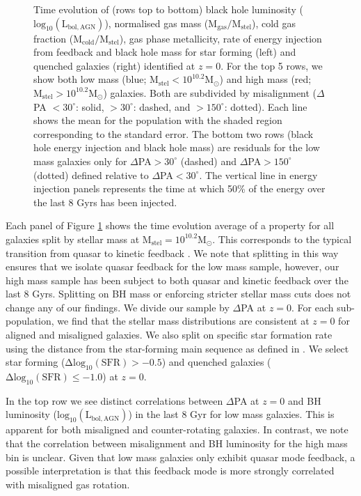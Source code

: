 \documentclass[fleqn,usenatbib]{mnras}
\begin{document}
\begin{figure}
    \caption{Time evolution of (rows top to bottom) black hole luminosity ($\mathrm{log_{10}(L_{bol, AGN})}$), normalised gas mass ($\mathrm{M_{gas}/M_{stel}}$), cold gas fraction ($\mathrm{M_{cold}/M_{stel}}$), gas phase metallicity, rate of energy injection from feedback and black hole mass for star forming (left) and quenched galaxies (right) identified at $z=0$. For the top 5 rows, we show both low mass (blue; $\mathrm{M_{stel} < 10^{10.2}M_{\odot}}$) and high mass (red; $\mathrm{M_{stel} > 10^{10.2}M_{\odot}}$) galaxies. Both are subdivided by misalignment ($\Delta$PA $< 30^{\circ}$: solid, $> 30^{\circ}$: dashed, and  $> 150^{\circ}$: dotted). Each line shows the mean for the population with the shaded region corresponding to the standard error. The bottom two rows (black hole energy injection and black hole mass) are residuals for the low mass galaxies only for $\Delta$PA$ > 30^{\circ}$ (dashed) and $\Delta$PA$ > 150^{\circ}$ (dotted) defined relative to $\Delta$PA$ < 30^{\circ}$. The vertical line in energy injection panels represents the time at which 50\% of the energy over the last 8 Gyrs has been injected.}
    \label{fig:overall_pop}
\end{figure}

Each panel of Figure \ref{fig:overall_pop} shows the time evolution average of a property for all galaxies split by stellar mass at $\mathrm{M_{stel} = 10^{10.2}M_{\odot}}$. This corresponds to the typical transition from quasar to kinetic feedback \citep[i.e. $\mathrm{M_{BH} \approx 10^{8}M_{\odot}}$, see Fig 1 in][]{li2019}. We note that splitting in this way ensures that we isolate quasar feedback for the low mass sample, however, our high mass sample has been subject to both quasar and kinetic feedback over the last 8 Gyrs. Splitting on BH mass or enforcing stricter stellar mass cuts does not change any of our findings. We divide our sample by $\Delta$PA at $z=0$. For each sub-population, we find that the stellar mass distributions are consistent at $z=0$ for aligned and misaligned galaxies. We also split on specific star formation rate using the distance from the star-forming main sequence as defined in \citet{pillepich2019}. We select star forming ($\mathrm{\Delta log_{10}(SFR) > −0.5}$) and quenched galaxies ($\mathrm{\Delta log_{10}(SFR) \leq -1.0}$) at $z=0$.

In the top row we see distinct correlations between $\Delta$PA at $z=0$ and BH luminosity ($\mathrm{log_{10}(L_{bol, AGN})}$) in the last 8 Gyr for low mass galaxies. This is apparent for both misaligned and counter-rotating galaxies. In contrast, we note that the correlation between misalignment and BH luminosity for the high mass bin is unclear. Given that low mass galaxies only exhibit quasar mode feedback, a possible interpretation is that this feedback mode is more strongly correlated with misaligned gas rotation. 
\end{document}
